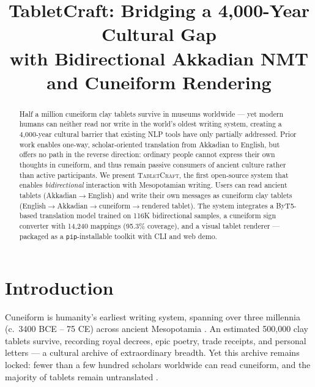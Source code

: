 \documentclass[11pt]{article}
\title{TabletCraft: Bridging a 4,000-Year Cultural Gap\\with Bidirectional Akkadian NMT and Cuneiform Rendering}
\author{}  %
\begin{document}
\maketitle

\begin{abstract}
Half a million cuneiform clay tablets survive in museums worldwide --- yet modern humans can neither read nor write in the world's oldest writing system, creating a 4,000-year cultural barrier that existing NLP tools have only partially addressed.
Prior work enables one-way, scholar-oriented translation from Akkadian to English, but offers no path in the reverse direction: ordinary people cannot express their own thoughts in cuneiform, and thus remain passive consumers of ancient culture rather than active participants.
We present \textsc{TabletCraft}, the first open-source system that enables \textit{bidirectional} interaction with Mesopotamian writing.
Users can read ancient tablets (Akkadian$\rightarrow$English) and write their own messages as cuneiform clay tablets (English$\rightarrow$Akkadian$\rightarrow$cuneiform$\rightarrow$rendered tablet).
The system integrates a ByT5-based translation model trained on 116K bidirectional samples, a cuneiform sign converter with 14,240 mappings (95.3\% coverage), and a visual tablet renderer --- packaged as a \texttt{pip}-installable toolkit with CLI and web demo.
\end{abstract}

\section{Introduction}

Cuneiform is humanity's earliest writing system, spanning over three millennia (c.~3400 BCE -- 75 CE) across ancient Mesopotamia \cite{walker1987cuneiform}.
An estimated 500,000 clay tablets survive, recording royal decrees, epic poetry, trade receipts, and personal letters \cite{gutherz2023translating} --- a cultural archive of extraordinary breadth.
Yet this archive remains locked: fewer than a few hundred scholars worldwide can read cuneiform, and the majority of tablets remain untranslated \cite{gordin2020reading}.
\end{document}

